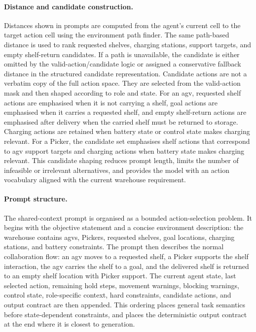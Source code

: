 \paragraph{Distance and candidate construction.}
Distances shown in prompts are computed from the agent's current cell to the target action cell using the environment path finder.
The same path-based distance is used to rank requested shelves, charging stations, support targets, and empty shelf-return candidates.
If a path is unavailable, the candidate is either omitted by the valid-action/candidate logic or assigned a conservative fallback distance in the structured candidate representation.
Candidate actions are not a verbatim copy of the full action space.
They are selected from the valid-action mask and then shaped according to role and state.
For an \gls{agv}, requested shelf actions are emphasised when it is not carrying a shelf, goal actions are emphasised when it carries a requested shelf, and empty shelf-return actions are emphasised after delivery when the carried shelf must be returned to storage.
Charging actions are retained when battery state or control state makes charging relevant.
For a Picker, the candidate set emphasises shelf actions that correspond to \gls{agv} support targets and charging actions when battery state makes charging relevant.
This candidate shaping reduces prompt length, limits the number of infeasible or irrelevant alternatives, and provides the model with an action vocabulary aligned with the current warehouse requirement.

\paragraph{Prompt structure.}
The shared-context prompt is organised as a bounded action-selection problem.
It begins with the objective statement and a concise environment description: the warehouse contains \glspl{agv}, Pickers, requested shelves, goal locations, charging stations, and battery constraints.
The prompt then describes the normal collaboration flow: an \gls{agv} moves to a requested shelf, a Picker supports the shelf interaction, the \gls{agv} carries the shelf to a goal, and the delivered shelf is returned to an empty shelf location with Picker support.
The current agent state, last selected action, remaining hold steps, movement warnings, blocking warnings, control state, role-specific context, hard constraints, candidate actions, and output contract are then appended.
This ordering places general task semantics before state-dependent constraints, and places the deterministic output contract at the end where it is closest to generation.

